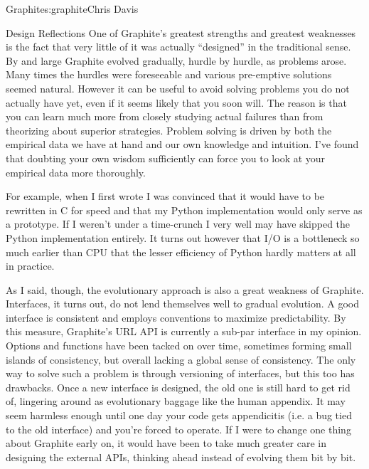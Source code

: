 \begin{aosachapter}{Graphite}{s:graphite}{Chris Davis}
\begin{aosasect1}{Design Reflections}
One of Graphite's greatest strengths and greatest weaknesses is the
fact that very little of it was actually ``designed'' in the
traditional sense.  By and large Graphite evolved gradually, hurdle by
hurdle, as problems arose. Many times the hurdles were foreseeable and
various pre-emptive solutions seemed natural. However it can be useful
to avoid solving problems you do not actually have yet, even if it
seems likely that you soon will. The reason is that you can learn much
more from closely studying actual failures than from theorizing about
superior strategies.  Problem solving is driven by both the empirical
data we have at hand and our own knowledge and intuition. I've found
that doubting your own wisdom sufficiently can force you to look at
your empirical data more thoroughly.

For example, when I first wrote  I was convinced that it would
have to be rewritten in C for speed and that my Python implementation
would only serve as a prototype. If I weren't under a time-crunch I
very well may have skipped the Python implementation entirely. It
turns out however that I/O is a bottleneck so much earlier than CPU
that the lesser efficiency of Python hardly matters at all in
practice.

As I said, though, the evolutionary approach is also a great weakness
of Graphite. Interfaces, it turns out, do not lend themselves well to
gradual evolution. A good interface is consistent and employs
conventions to maximize predictability. By this measure, Graphite's
URL API is currently a sub-par interface in my opinion. Options and
functions have been tacked on over time, sometimes forming small
islands of consistency, but overall lacking a global sense of
consistency. The only way to solve such a problem is through
versioning of interfaces, but this too has drawbacks. Once a new
interface is designed, the old one is still hard to get rid of,
lingering around as evolutionary baggage like the human appendix. It
may seem harmless enough until one day your code gets appendicitis
(i.e. a bug tied to the old interface) and you're forced to
operate. If I were to change one thing about Graphite early on, it
would have been to take much greater care in designing the external
APIs, thinking ahead instead of evolving them bit by bit.


\end{aosasect1}
\end{aosachapter}
